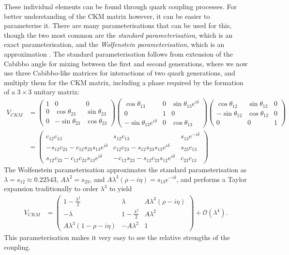 \documentclass[a4paper,12pt]{article}
\begin{document}
These individual elements can be found through quark coupling processes. 
For better understanding of the CKM matrix however, it can be easier to parameterise it. 
There are many parameterisations that can be used for this, though the two most common are the \emph{standard parameterisation}, which is an exact parameterisation, and the \emph{Wolfenstein parameterisation}, which is an approximation \cite{l}.
The standard parameterisation follows from extension of the Cabibbo angle for mixing between the first and second generations, where we now use three Cabibbo-like matrices for interactions of two quark generations, and multiply them for the CKM matrix, including a phase required by the formation of a $3\times3$ unitary matrix:
\begin{equation}
    \label{eq:standpar}
    \begin{split}
        V_{CKM} &= \begin{pmatrix}1&0&0\\0&\cos\theta_{23}&\sin\theta_{23}\\0&-\sin\theta_{23}&\cos\theta_{23}\end{pmatrix}\begin{pmatrix}\cos\theta_{13}&0&\sin\theta_{13}e^{i\delta}\\0&1&0\\-\sin\theta_{13}e^{i\delta}&0&\cos\theta_{13}\end{pmatrix}\begin{pmatrix}\cos\theta_{12}&\sin\theta_{12}&0\\-\sin\theta_{12}&\cos\theta_{12}&0\\0&0&1\end{pmatrix}\\
                &= \begin{pmatrix}c_{12}c_{13} & s_{12}c_{13} & s_{13}e^{-i\delta} \\ -s_{12}c_{23}-c_{12}s_{23}s_{13}e^{i\delta} & c_{12}c_{23}-s_{12}s_{23}s_{13}e^{i\delta} & s_{23}c_{13} \\ s_{12}c_{23}-c_{12}c_{23}s_{13}e^{i\delta} & -c_{12}s_{23}-s_{12}c_{23}s_{12}e^{i\delta} & c_{23}c_{13}\end{pmatrix}
    \end{split}
\end{equation}
The Wolfenstein parameterisation approximates the standard parameterisation as $\lambda=s_{12}\approx0.22543$, $A\lambda^2=s_{23}$, and $A\lambda^3(\rho-i\eta)=s_{13}e^{-i\delta}$, and performs a Taylor expansion traditionally to order $\lambda^3$ to yield
\begin{align}
    \label{eq:wolfie}
    V_{CKM} &= \begin{pmatrix} 1-\frac{\lambda^2}{2} & \lambda & A\lambda^3(\rho-i\eta) \\ -\lambda & 1-\frac{\lambda^2}{2} & A\lambda^2 \\ A\lambda^3(1-\rho-i\eta) & -A\lambda^2 & 1\end{pmatrix} + \mathcal{O}(\lambda^4).
\end{align}
This parameterisation makes it very easy to see the relative strengths of the coupling. 
\end{document}
